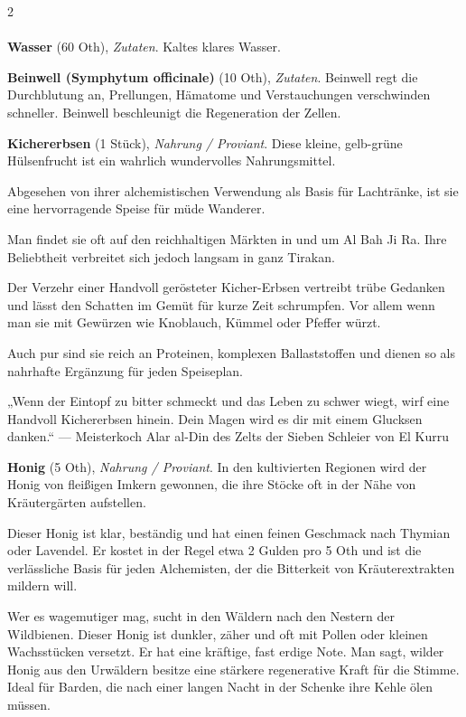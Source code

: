 \begin{multicols}{2}
    \paragraph{}
    \begin{denseitemize}
        \item \textbf{Wasser} (60 Oth), \textit{Zutaten}.
        Kaltes klares Wasser.
        \item \textbf{Beinwell (Symphytum officinale)} (10 Oth), \textit{Zutaten}.
        Beinwell regt die Durchblutung an, Prellungen, Hämatome und Verstauchungen verschwinden schneller. Beinwell beschleunigt die Regeneration der Zellen.
        \item \textbf{Kichererbsen} (1 Stück), \textit{Nahrung / Proviant}.
        Diese kleine, gelb-grüne Hülsenfrucht ist ein wahrlich wundervolles Nahrungsmittel.

Abgesehen von ihrer alchemistischen Verwendung als Basis für Lachtränke, ist sie eine hervorragende Speise für müde Wanderer.

Man findet sie oft auf den reichhaltigen Märkten in und um Al Bah Ji Ra. Ihre Beliebtheit verbreitet sich jedoch langsam in ganz Tirakan.

Der Verzehr einer Handvoll gerösteter Kicher-Erbsen vertreibt trübe Gedanken und lässt den Schatten im Gemüt für kurze Zeit schrumpfen. Vor allem wenn man sie mit Gewürzen wie Knoblauch, Kümmel oder Pfeffer würzt.

Auch pur sind sie reich an Proteinen, komplexen Ballaststoffen und dienen so als nahrhafte Ergänzung für jeden Speiseplan.

„Wenn der Eintopf zu bitter schmeckt und das Leben zu schwer wiegt, wirf eine Handvoll Kichererbsen hinein. Dein Magen wird es dir mit einem Glucksen danken.“
— Meisterkoch Alar al-Din des Zelts der Sieben Schleier von El Kurru
        \item \textbf{Honig} (5 Oth), \textit{Nahrung / Proviant}.
        In den kultivierten Regionen wird der Honig von fleißigen Imkern gewonnen, die ihre Stöcke oft in der Nähe von Kräutergärten aufstellen.

Dieser Honig ist klar, beständig und hat einen feinen Geschmack nach Thymian oder Lavendel. Er kostet in der Regel etwa 2 Gulden pro 5 Oth und ist die verlässliche Basis für jeden Alchemisten, der die Bitterkeit von Kräuterextrakten mildern will.

Wer es wagemutiger mag, sucht in den Wäldern nach den Nestern der Wildbienen. Dieser Honig ist dunkler, zäher und oft mit Pollen oder kleinen Wachsstücken versetzt. Er hat eine kräftige, fast erdige Note. Man sagt, wilder Honig aus den Urwäldern besitze eine stärkere regenerative Kraft für die Stimme. Ideal für Barden, die nach einer langen Nacht in der Schenke ihre Kehle ölen müssen.
    \end{denseitemize}



\end{multicols}
